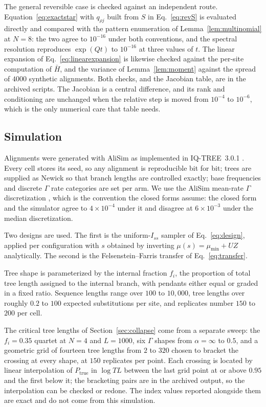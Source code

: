 \documentclass[preprint,12pt,authoryear]{elsarticle}
\newcommand{\Iss}{I_{ss}}
\newcommand{\Hbar}{\bar H}
\theoremstyle{definition}
\theoremstyle{remark}
\begin{document}
The general reversible case is checked against an independent route.
Equation~\eqref{eq:exactstar} with $q_{\rho j}$ built from
$S$ in Eq.~\eqref{eq:revS} is evaluated directly and compared with the
pattern enumeration of Lemma~\ref{lem:multinomial} at $N=8$: the two agree
to $10^{-16}$ under both conventions, and the spectral resolution reproduces
$\exp(Qt)$ to $10^{-16}$ at three values of $t$. The linear expansion of
Eq.~\eqref{eq:linearexpansion} is likewise checked against the per-site
computation of $\Hbar$, and the variance of Lemma~\ref{lem:moment} against
the spread of $4000$ synthetic alignments. Both checks, and the Jacobian
table, are in the archived scripts. The Jacobian is a central difference, and
its rank and conditioning are unchanged when the relative step is moved from
$10^{-4}$ to $10^{-6}$, which is the only numerical care that table needs.

\subsection{Simulation}
\label{sec:simulation-methods}

Alignments were generated with AliSim \citep{lytrong2022alisim} as
implemented in IQ-TREE~3.0.1 \citep{minh2020iqtree2}. Every cell stores its
seed, so any alignment is reproducible bit for bit; trees are supplied as
Newick so that branch lengths are controlled exactly; base frequencies and
discrete $\Gamma$ rate categories are set per arm. We use the AliSim
mean-rate $\Gamma$ discretization \citep{yang1994discretegamma}, which is the
convention the closed forms assume: the closed form and the simulator agree
to $4\times10^{-4}$ under it and disagree at $6\times10^{-3}$ under the median
discretization.

Two designs are used. The first is the uniform-$\Iss$ sampler of
Eq.~\eqref{eq:design}, applied per configuration with $s$ obtained by
inverting $\mu(s)=\mu_{\min}+UZ$ analytically. The second is the
Felsenstein--Farris transfer of Eq.~\eqref{eq:transfer}.

Tree shape is parameterized by the internal fraction $f_i$, the proportion of
total tree length assigned to the internal branch, with pendants either equal
or graded in a fixed ratio. Sequence lengths range over $100$ to $10{,}000$,
tree lengths over roughly $0.2$ to $100$ expected substitutions per site, and
replicates number $150$ to $200$ per cell.

The critical tree lengths of Section~\ref{sec:collapse} come from a separate
sweep: the $f_i=0.35$ quartet at $N=4$ and $L=1000$, six $\Gamma$ shapes from
$\alpha=\infty$ to $0.5$, and a geometric grid of fourteen tree lengths from
$2$ to $320$ chosen to bracket the crossing at every shape, at $150$
replicates per point. Each crossing is located by linear interpolation of
$P_{\mathrm{true}}$ in $\log TL$ between the last grid point at or above
$0.95$ and the first below it; the bracketing pairs are in the archived
output, so the interpolation can be checked or redone. The index values
reported alongside them are exact and do not come from this simulation.
\end{document}
